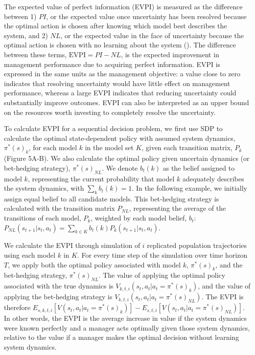 \documentclass[
  11pt,
  a4paper,
]{article}
\begin{document}
The expected value of perfect information (EVPI) is measured as the difference between 1) \(PI\), or the expected value once uncertainty has been resolved because the optimal action is chosen after knowing which model best describes the system, and 2) \(NL\), or the expected value in the face of uncertainty because the optimal action is chosen with no learning about the system (). The difference between these terms, \(\text{EVPI} = PI - NL\), is the expected improvement in management performance due to acquiring perfect information. EVPI is expressed in the same units as the management objective: a value close to zero indicates that resolving uncertainty would have little effect on management performance, whereas a large EVPI indicates that reducing uncertainty could substantially improve outcomes. EVPI can also be interpreted as an upper bound on the resources worth investing to completely resolve the uncertainty.

To calculate EVPI for a sequential decision problem, we first use SDP to calculate the optimal state-dependent policy with assumed system dynamics, \(\pi^*(s)_k\), for each model \(k\) in the model set \(K\), given each transition matrix, \(P_k\) (Figure 5A-B). We also calculate the optimal policy given uncertain dynamics (or bet-hedging strategy), \(\pi^*(s)_{NL}\). We denote \(b_t(k)\) as the belief assigned to model \(k\), representing the current probability that model \(k\) adequately describes the system dynamics, with \(\sum_k b_t(k)=1\). In the following example, we initially assign equal belief to all candidate models. This bet-hedging strategy is calculated with the transition matrix \(P_{NL}\), representing the average of the transitions of each model, \(P_k\), weighted by each model belief, \(b_t\): \(P_{NL}(s_{t+1}|s_t, a_t) = \sum_{k\in K}b_t(k)P_k(s_{t+1}|s_t, a_t)\).

We calculate the EVPI through simulation of \(i\) replicated population trajectories using each model \(k\) in \(K\). For every time step of the simulation over time horizon \(T\), we apply both the optimal policy associated with model \(k\), \(\pi^*(s)_k\), and the bet-hedging strategy, \(\pi^*(s)_{NL}\). The value of applying the optimal policy associated with the true dynamics is \(V_{k,t,i}(s_t, a_t | a_t = \pi^*(s)_k)\), and the value of applying the bet-hedging strategy is \(V_{k,t,i}(s_t, a_t | a_t = \pi^*(s)_{NL})\). The EVPI is therefore \(E_{s,k,t,i}[V(s_t, a_t | a_t = \pi^*(s)_k)] - E_{s,t,i}[V(s_t, a_t | a_t = \pi^*(s)_{NL})]\). In other words, the EVPI is the average increase in value if the system dynamics were known perfectly and a manager acts optimally given those system dynamics, relative to the value if a manager makes the optimal decision without learning system dynamics.
\end{document}
